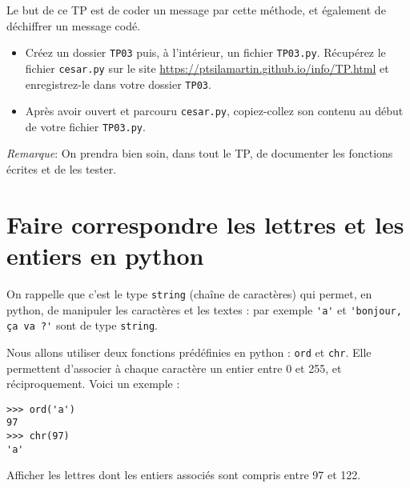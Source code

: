 Le but de ce TP est de coder un message par cette méthode, et également de déchiffrer un message codé. 
\bigskip
\begin{itemize}
\item[\textbullet] Créez un dossier \texttt{TP03} puis, à l'intérieur, un fichier \texttt{TP03.py}. 
Récupérez  le fichier \texttt{cesar.py} sur le site \url{https://ptsilamartin.github.io/info/TP.html}  et enregistrez-le dans votre dossier \texttt{TP03}.
\item[\textbullet] Après avoir ouvert et parcouru \texttt{cesar.py}, copiez-collez son contenu au début de votre fichier \texttt{TP03.py}.
\end{itemize}

\bigskip
%

\emph{Remarque}: On prendra bien soin, dans tout le TP, de documenter les fonctions écrites et de les tester.



\section*{Faire correspondre les lettres et les entiers en python}

On rappelle que c'est le type \texttt{string} (chaîne de caractères) qui permet, en python, de manipuler les caractères et les textes : par exemple \lstinline{'a'} et \lstinline{'bonjour, ça va ?'} sont de type \texttt{string}.

Nous allons utiliser deux fonctions prédéfinies en python : \lstinline{ord} et \lstinline{chr}. Elle permettent d'associer à chaque caractère un entier entre 0 et 255, et réciproquement.  Voici un exemple :
\begin{lstlisting}
>>> ord('a')
97
>>> chr(97)
'a'
\end{lstlisting}


\begin{question}
Afficher les lettres dont les entiers associés sont compris entre 97 et 122.
\end{question}



